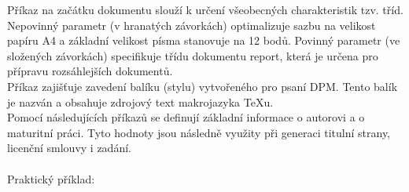 \documentclass[a4paper, 12pt]{report}
\begin{document}
	Příkaz  na začátku dokumentu slouží k určení všeobecných charakteristik tzv. tříd. Nepovinný parametr (v hranatých závorkách) optimalizuje sazbu na velikost papíru A4 a základní velikost písma stanovuje na 12 bodů. Povinný parametr (ve složených závorkách) specifikuje třídu dokumentu report, která je určena pro přípravu rozsáhlejších dokumentů.\\
	Příkaz  zajišťuje zavedení balíku (stylu) vytvořeného pro psaní DPM. Tento balík je nazván  a obsahuje zdrojový text makrojazyka \TeX u.\\
	Pomocí následujících příkazů se definují základní informace o autorovi a o maturitní práci. Tyto hodnoty jsou následně využity při generaci titulní strany, licenční smlouvy i zadání.\\
	\\
	\novastrana 
	Praktický příklad:\\
\end{document}
